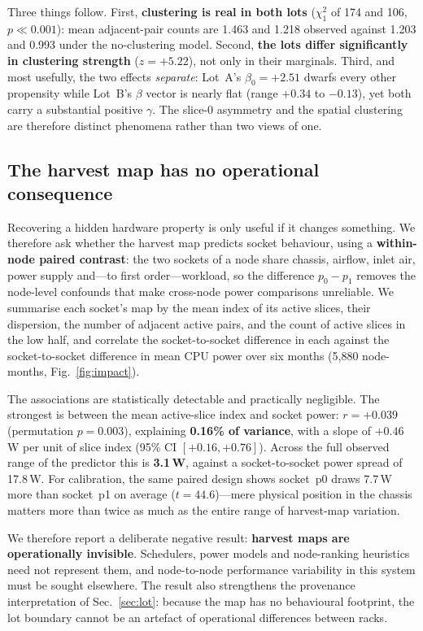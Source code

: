 \documentclass[10pt,conference]{IEEEtran}
\begin{document}
Three things follow. First, \textbf{clustering is real in both lots} ($\chi^2_1$ of 174 and 106,
$p\ll0.001$): mean adjacent-pair counts are 1.463 and 1.218 observed against 1.203 and 0.993 under
the no-clustering model. Second, \textbf{the lots differ significantly in clustering strength}
($z=+5.22$), not only in their marginals. Third, and most usefully, the two effects
\emph{separate}: Lot~A's $\beta_0=+2.51$ dwarfs every other propensity while Lot~B's $\beta$ vector
is nearly flat (range $+0.34$ to $-0.13$), yet both carry a substantial positive $\gamma$. The
slice-0 asymmetry and the spatial clustering are therefore distinct phenomena rather than two
views of one.

\subsection{The harvest map has no operational consequence}
\label{sec:impact}
Recovering a hidden hardware property is only useful if it changes something. We therefore ask
whether the harvest map predicts socket behaviour, using a \textbf{within-node paired contrast}:
the two sockets of a node share chassis, airflow, inlet air, power supply and---to first
order---workload, so the difference $p_0-p_1$ removes the node-level confounds that make
cross-node power comparisons unreliable. We summarise each socket's map by the mean index of its
active slices, their dispersion, the number of adjacent active pairs, and the count of active
slices in the low half, and correlate the socket-to-socket difference in each against the
socket-to-socket difference in mean CPU power over six months (5{,}880 node-months,
Fig.~\ref{fig:impact}).

The associations are statistically detectable and practically negligible. The strongest is between
the mean active-slice index and socket power: $r=+0.039$ (permutation $p=0.003$), explaining
\textbf{0.16\% of variance}, with a slope of $+0.46$\,W per unit of slice index
(95\% CI $[+0.16,+0.76]$). Across the full observed range of the predictor this is
\textbf{3.1\,W}, against a socket-to-socket power spread of 17.8\,W. For calibration, the same
paired design shows socket~p0 draws $7.7$\,W more than socket~p1 on average ($t=44.6$)---mere
physical position in the chassis matters more than twice as much as the entire range of harvest-map
variation.

We therefore report a deliberate negative result: \textbf{harvest maps are operationally
invisible}. Schedulers, power models and node-ranking heuristics need not represent them, and
node-to-node performance variability in this system must be sought elsewhere. The result also
strengthens the provenance interpretation of Sec.~\ref{sec:lot}: because the map has no
behavioural footprint, the lot boundary cannot be an artefact of operational differences between
racks.
\end{document}
